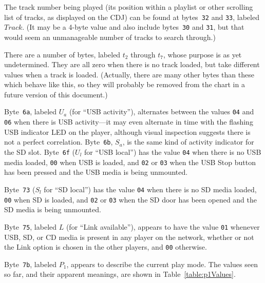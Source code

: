 \documentclass[11pt]{article}
\begin{document}
The track number being played (its position within a playlist or other
scrolling list of tracks, as displayed on the CDJ) can be found at
bytes~{\tt 32} and {\tt 33}, labeled $Track$. (It may be a 4-byte
value and also include bytes~{\tt 30} and {\tt 31}, but that would
seem an unmanageable number of tracks to search through.)

There are a number of bytes, labeled $t_2$ through $t_7$, whose
purpose is as yet undetermined. They are all zero when there is no
track loaded, but take different values when a track is loaded.
(Actually, there are many other bytes than these which behave like
this, so they will probably be removed from the chart in a future
version of this document.)

Byte~{\tt 6a}, labeled $U_a$ (for ``USB activity''), alternates
between the values {\tt 04} and {\tt 06} when there is USB
activity---it may even alternate in time with the flashing USB
indicator LED on the player, although visual inspection suggests there
is not a perfect correlation. Byte~{\tt 6b}, $S_a$, is the same kind
of activity indicator for the SD slot. Byte~{\tt 6f} ($U_l$ for ``USB
local'') has the value {\tt 04} when there is no USB media loaded,
{\tt 00} when USB is loaded, and {\tt 02} or {\tt 03} when the USB
Stop button has been pressed and the USB media is being unmounted.

Byte~{\tt 73} ($S_l$ for ``SD local'') has the value {\tt 04} when
there is no SD media loaded, {\tt 00} when SD is loaded, and {\tt 02}
or {\tt 03} when the SD door has been opened and the SD media is being
unmounted.

Byte~{\tt 75}, labeled $L$ (for ``Link available''), appears to have
the value {\tt 01} whenever USB, SD, or CD media is present in any
player on the network, whether or not the Link option is chosen in the
other players, and {\tt 00} otherwise.

Byte~{\tt 7b}, labeled $P_1$, appears to describe the current play mode.
The values seen so far, and their apparent meanings, are shown in
Table~\ref{table:p1Values}.
\end{document}
